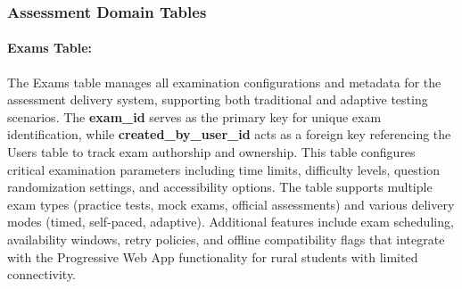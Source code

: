 \documentclass[12pt,a4paper,oneside]{book}
\begin{document}
\clearpage
\subsubsection{Assessment Domain Tables}

\paragraph{Exams Table:}
The Exams table manages all examination configurations and metadata for the assessment delivery system, supporting both traditional and adaptive testing scenarios. The \textbf{exam\_id} serves as the primary key for unique exam identification, while \textbf{created\_by\_user\_id} acts as a foreign key referencing the Users table to track exam authorship and ownership. This table configures critical examination parameters including time limits, difficulty levels, question randomization settings, and accessibility options. The table supports multiple exam types (practice tests, mock exams, official assessments) and various delivery modes (timed, self-paced, adaptive). Additional features include exam scheduling, availability windows, retry policies, and offline compatibility flags that integrate with the Progressive Web App functionality for rural students with limited connectivity.
\end{document}
